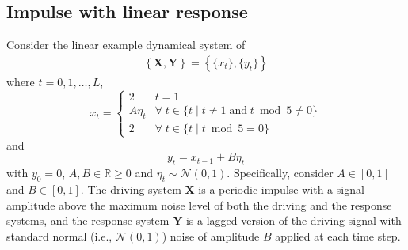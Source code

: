 \subsection{Impulse with linear response}
\label{sec:IR}
Consider the linear example dynamical system of
\begin{eqnarray}
\label{eqn:IReqn}
\left\{\mathbf{X},\mathbf{Y}\right\} = \left\{\{x_t\},\{y_t\}\right\}
\end{eqnarray}
where $t=0,1,\ldots,L$,
\begin{equation*}
x_t = \left\{
  \begin{array}{lr}
    2 & t = 1\\
    A\eta_t & \forall\; t\in\{t\;|\;t\neq 1 \;\mathrm{and}\; t\bmod 5 \neq 0\}\\
    2 & \forall\; t\in\{t\;|\;t\bmod 5 = 0\}
  \end{array}
\right.
\end{equation*}
and
\begin{equation*}
y_t = x_{t-1} + B\eta_t
\end{equation*}
with $y_0 = 0$, $A,B\in\mathbb{R}\ge 0$ and $\eta_t\sim\mathcal{N}\left(0,1\right)$.  Specifically, consider $A\in[0,1]$ and $B\in[0,1]$.  The driving system $\mathbf{X}$ is a periodic impulse with a signal amplitude above the maximum noise level of both the driving and the response systems, and the response system $\mathbf{Y}$ is a lagged version of the driving signal with standard normal (i.e.,  $\mathcal{N}\left(0,1\right)$) noise of amplitude $B$ applied at each time step.  

